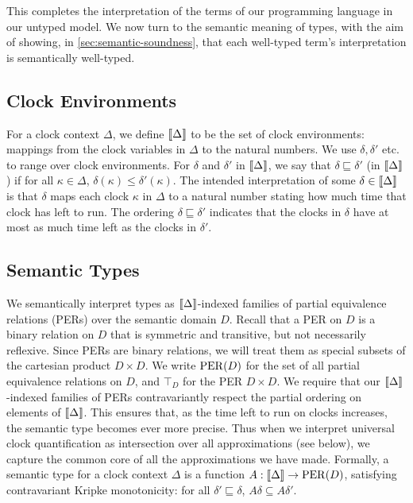 This completes the interpretation of the terms of our programming
language in our untyped model. We now turn to the semantic meaning of
types, with the aim of showing, in \autoref{sec:semantic-soundness},
that each well-typed term's interpretation is semantically well-typed.

\subsection{Clock Environments}\label{sec:clock-envs}

For a clock context $\Delta$, we define $\llbracket \Delta \rrbracket$ to be the
set of clock environments: mappings from the clock variables in
$\Delta$ to the natural numbers. We use $\delta, \delta'$ etc. to
range over clock environments. For $\delta$ and $\delta'$ in
$\llbracket \Delta \rrbracket$, we say that $\delta \sqsubseteq \delta'$ (in
$\llbracket \Delta \rrbracket$) if for all $\kappa \in \Delta$, $\delta(\kappa) \leq
\delta'(\kappa)$. The intended interpretation of some $\delta \in
\llbracket \Delta \rrbracket$ is that $\delta$ maps each clock $\kappa$ in $\Delta$
to a natural number stating how much time that clock has left to
run. The ordering $\delta \sqsubseteq \delta'$ indicates that the
clocks in $\delta$ have at most as much time left as the clocks in
$\delta'$.

\subsection{Semantic Types}\label{sec:semantic-types}

We semantically interpret types as $\llbracket \Delta \rrbracket$-indexed families of
partial equivalence relations (PERs) over the semantic domain
$D$. Recall that a PER on $D$ is a binary relation on $D$ that is
symmetric and transitive, but not necessarily reflexive. Since PERs
are binary relations, we will treat them as special subsets of the
cartesian product $D \times D$. We write $\mathrm{PER}(D)$ for the set of all
partial equivalence relations on $D$, and $\top_D$ for the PER $D
\times D$. 
We require that our $\llbracket \Delta \rrbracket$-indexed families of PERs
contravariantly respect the partial ordering on elements of
$\llbracket \Delta \rrbracket$. This ensures that, as the time left to run on clocks
increases, the semantic type becomes ever more precise. Thus when we
interpret universal clock quantification as intersection over all
approximations (see below), we capture the common core of all the
approximations we have made. Formally, a semantic type for a clock
context $\Delta$ is a function $A : \llbracket \Delta \rrbracket \to \mathrm{PER}(D)$,
satisfying contravariant Kripke monotonicity: for all $\delta'
\sqsubseteq \delta$, $A\delta \subseteq A\delta'$.

